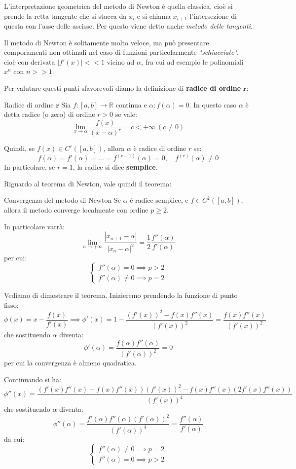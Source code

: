 \documentclass[a4paper,11pt]{article}
\begin{document}
L'interpretazione geometrica del metodo di Newton è quella classica, cioè si prende la retta tangente che si stacca da $x_i$ e si chiama $x_{i + 1}$ l'intersezione di questa con l'asse delle ascisse. 
Per questo viene detto anche \textit{metodo delle tangenti}.

Il metodo di Newton è solitamente molto veloce, ma può presentare comporamenti non ottimali nel caso di funzioni particolarmente \textit{"schiacciate"}, cioè con derivata $|f'(x)| << 1$ vicino ad $\alpha$, fra cui ad esempio le polinomiali $x^n$ con $n >> 1$.

Per valutare questi punti sfavorevoli diamo la definizione di \textbf{radice di ordine} $\mathbf{r}$:
\begin{definition}{Radice di ordine $\mathbf{r}$}
	Sia $f : [a, b] \rightarrow \mathbb{R}$ continua e $\alpha : f(\alpha) = 0$.
	In questo caso $\alpha$ è detta radice (o zero) di ordine $r > 0$ se vale:
	$$
		\lim_{x \rightarrow \alpha} \frac{f(x)}{(x - \alpha)^r} = c < + \infty \ (c \neq 0)
	$$
\end{definition}
Quindi, se $f(x) \in C^r([a, b])$, allora $\alpha$ è radice di ordine $r$ se:
$$
f(\alpha) = f'(\alpha) = ... = f^{(r - 1)}(\alpha) = 0, \quad f^{(r)} (\alpha) \neq 0
$$
In particolare, se $r = 1$, la radice si dice \textbf{semplice}.

Riguardo al teorema di Newton, vale quindi il teorema:
\begin{theorem}{Convergenza del metodo di Newton}
	Se $\alpha$ è radice semplice, e $f \in C^2([a, b])$, allora il metodo converge localmente con ordine $p \geq 2$.
\end{theorem}
In particolare varrà:
$$
	\lim_{n \rightarrow +\infty} \frac{|x_{n + 1} - \alpha|}{|x_n - \alpha|^2} = \frac{1}{2} \frac{f''(\alpha)}{f'(\alpha)}
$$
per cui:
\[
	\begin{cases}
		f''(\alpha) = 0 \implies p > 2 \\
		f''(\alpha) \neq 0 \implies p = 2
	\end{cases}
\]

Vediamo di dimostrare il teorema.
Inizieremo prendendo la funzione di punto fisso:
$$
\phi(x) = x - \frac{f(x)}{f'(x)} \implies \phi'(x) = 1 - \frac{(f'(x))^2 - f (x) f''(x)}{(f'(x))^2} = \frac{f(x) f''(x)}{(f'(x))^2}
$$
che sostituendo $\alpha$ diventa:
$$
\phi'(\alpha) = \frac{f(\alpha) f''(\alpha)}{(f'(\alpha))^2} = 0
$$
per cui la convergenza è almeno quadratica.

Continuando si ha:
$$
\phi''(x) = \frac{( f'(x) f''(x) + f(x) f''(x) ) (f'(x))^2 - f(x) f''(x) ( 2f'(x) f''(x) ) }{(f'(x))^4}
$$
che sostituendo $\alpha$ diventa:
$$
\phi''(\alpha) = \frac{f'(\alpha) f''(\alpha) \left( f'(\alpha) \right)^2 }{ ( f'(\alpha) )^4 } = \frac{f''(\alpha)}{f'(\alpha)}
$$
da cui:
\[
	\begin{cases}
		f''(\alpha) \neq 0 \implies p = 2 \\
		f''(\alpha) = 0 \implies p > 2
	\end{cases}
\]
\end{document}
